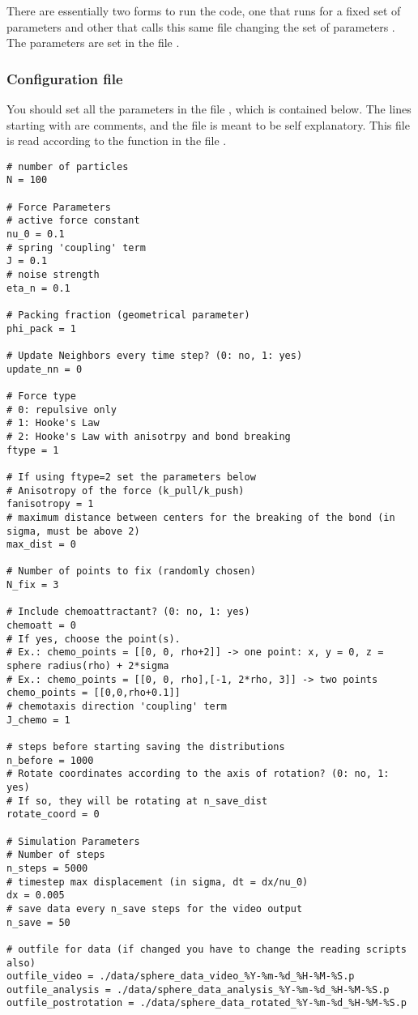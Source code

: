 \documentclass[12pt]{article}
\begin{document}
There are essentially two forms to run the code, one that runs for a fixed set of parameters  and other that calls this same file changing the set of parameters . The parameters are set in the file .

\subsubsection{Configuration file}

You should set all the parameters in the file , which is contained below. The lines starting with  are comments, and the file is meant to be self explanatory. This file is read according to the function  in the file .

\begin{verbatim}
# number of particles
N = 100

# Force Parameters
# active force constant
nu_0 = 0.1
# spring 'coupling' term
J = 0.1
# noise strength
eta_n = 0.1

# Packing fraction (geometrical parameter)
phi_pack = 1

# Update Neighbors every time step? (0: no, 1: yes)
update_nn = 0

# Force type
# 0: repulsive only
# 1: Hooke's Law
# 2: Hooke's Law with anisotrpy and bond breaking
ftype = 1

# If using ftype=2 set the parameters below
# Anisotropy of the force (k_pull/k_push)
fanisotropy = 1
# maximum distance between centers for the breaking of the bond (in sigma, must be above 2)
max_dist = 0

# Number of points to fix (randomly chosen)
N_fix = 3

# Include chemoattractant? (0: no, 1: yes)
chemoatt = 0
# If yes, choose the point(s).
# Ex.: chemo_points = [[0, 0, rho+2]] -> one point: x, y = 0, z = sphere radius(rho) + 2*sigma
# Ex.: chemo_points = [[0, 0, rho],[-1, 2*rho, 3]] -> two points
chemo_points = [[0,0,rho+0.1]]
# chemotaxis direction 'coupling' term
J_chemo = 1

# steps before starting saving the distributions
n_before = 1000
# Rotate coordinates according to the axis of rotation? (0: no, 1: yes)
# If so, they will be rotating at n_save_dist
rotate_coord = 0

# Simulation Parameters
# Number of steps
n_steps = 5000
# timestep max displacement (in sigma, dt = dx/nu_0)
dx = 0.005
# save data every n_save steps for the video output
n_save = 50

# outfile for data (if changed you have to change the reading scripts also)
outfile_video = ./data/sphere_data_video_%Y-%m-%d_%H-%M-%S.p
outfile_analysis = ./data/sphere_data_analysis_%Y-%m-%d_%H-%M-%S.p
outfile_postrotation = ./data/sphere_data_rotated_%Y-%m-%d_%H-%M-%S.p
\end{verbatim}
\end{document}
